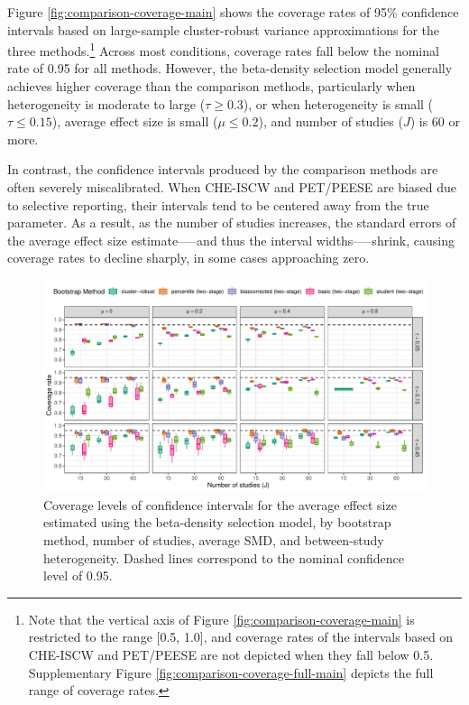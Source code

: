 \documentclass[
  american,
  man, donotrepeattitle,floatsintext]{apa7}
\begin{document}
Figure \ref{fig:comparison-coverage-main} shows the coverage rates of 95\% confidence intervals based on large-sample cluster-robust variance approximations for the three methods.\footnote{Note that the vertical axis of Figure \ref{fig:comparison-coverage-main} is restricted to the range {[}0.5, 1.0{]}, and coverage rates of the intervals based on CHE-ISCW and PET/PEESE are not depicted when they fall below 0.5. Supplementary Figure \ref{fig:comparison-coverage-full-main} depicts the full range of coverage rates.}
Across most conditions, coverage rates fall below the nominal rate of 0.95 for all methods.
However, the beta-density selection model generally achieves higher coverage than the comparison methods, particularly when heterogeneity is moderate to large (\(\tau \geq 0.3\)), or when heterogeneity is small (\(\tau \leq 0.15\)), average effect size is small (\(\mu \leq 0.2\)), and number of studies (\(J\)) is 60 or more.

In contrast, the confidence intervals produced by the comparison methods are often severely miscalibrated. When CHE-ISCW and PET/PEESE are biased due to selective reporting, their intervals tend to be centered away from the true parameter. As a result, as the number of studies increases, the standard errors of the average effect size estimate-----and thus the interval widths-----shrink, causing coverage rates to decline sharply, in some cases approaching zero.

\begin{figure}
\includegraphics{beta-function-selection-models-with-dependent-effects_files/figure-latex/Beta-coverage-main-1} \caption{Coverage levels of confidence intervals for the average effect size estimated using the beta-density selection model, by bootstrap method, number of studies, average SMD, and between-study heterogeneity. Dashed lines correspond to the nominal confidence level of 0.95.}\label{fig:Beta-coverage-main}
\end{figure}
\end{document}
